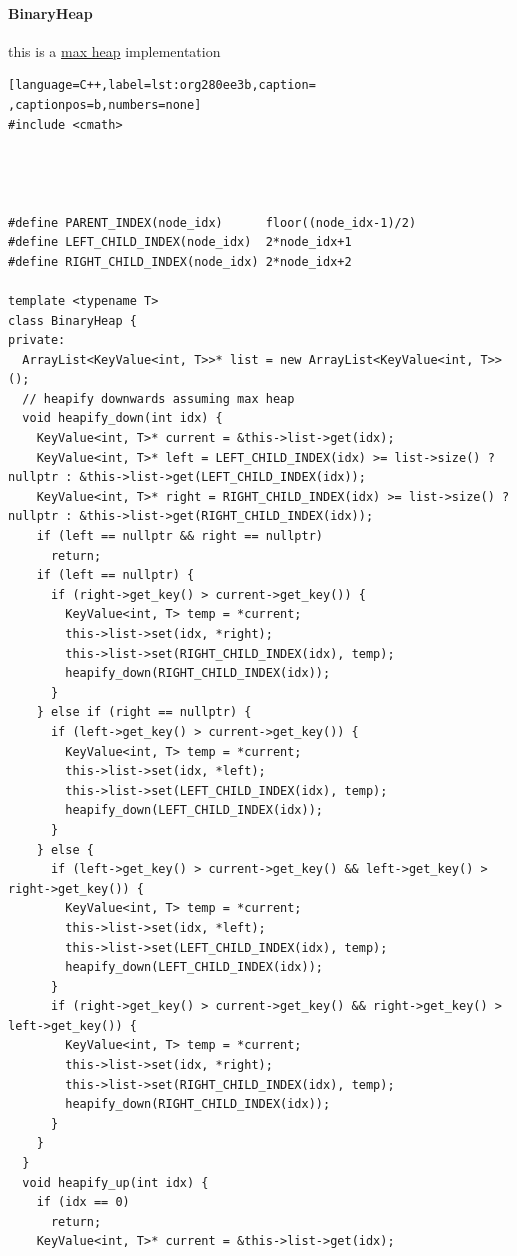 \documentclass[a4paper,12pt]{article}
\begin{document}
\paragraph{BinaryHeap}
\label{sec:org2eac639}
\begin{note}
this is a \hyperref[sec:org75e2e7b]{max heap} implementation\\[0pt]
\end{note}
\begin{lstlisting}[language=C++,label=lst:org280ee3b,caption= ,captionpos=b,numbers=none]
#include <cmath>




#define PARENT_INDEX(node_idx)      floor((node_idx-1)/2)
#define LEFT_CHILD_INDEX(node_idx)  2*node_idx+1
#define RIGHT_CHILD_INDEX(node_idx) 2*node_idx+2

template <typename T>
class BinaryHeap {
private:
  ArrayList<KeyValue<int, T>>* list = new ArrayList<KeyValue<int, T>>();
  // heapify downwards assuming max heap
  void heapify_down(int idx) {
    KeyValue<int, T>* current = &this->list->get(idx);
    KeyValue<int, T>* left = LEFT_CHILD_INDEX(idx) >= list->size() ? nullptr : &this->list->get(LEFT_CHILD_INDEX(idx));
    KeyValue<int, T>* right = RIGHT_CHILD_INDEX(idx) >= list->size() ? nullptr : &this->list->get(RIGHT_CHILD_INDEX(idx));
    if (left == nullptr && right == nullptr)
      return;
    if (left == nullptr) {
      if (right->get_key() > current->get_key()) {
        KeyValue<int, T> temp = *current;
        this->list->set(idx, *right);
        this->list->set(RIGHT_CHILD_INDEX(idx), temp);
        heapify_down(RIGHT_CHILD_INDEX(idx));
      }
    } else if (right == nullptr) {
      if (left->get_key() > current->get_key()) {
        KeyValue<int, T> temp = *current;
        this->list->set(idx, *left);
        this->list->set(LEFT_CHILD_INDEX(idx), temp);
        heapify_down(LEFT_CHILD_INDEX(idx));
      }
    } else {
      if (left->get_key() > current->get_key() && left->get_key() > right->get_key()) {
        KeyValue<int, T> temp = *current;
        this->list->set(idx, *left);
        this->list->set(LEFT_CHILD_INDEX(idx), temp);
        heapify_down(LEFT_CHILD_INDEX(idx));
      }
      if (right->get_key() > current->get_key() && right->get_key() > left->get_key()) {
        KeyValue<int, T> temp = *current;
        this->list->set(idx, *right);
        this->list->set(RIGHT_CHILD_INDEX(idx), temp);
        heapify_down(RIGHT_CHILD_INDEX(idx));
      }
    }
  }
  void heapify_up(int idx) {
    if (idx == 0)
      return;
    KeyValue<int, T>* current = &this->list->get(idx);

\end{lstlisting}
\end{document}
